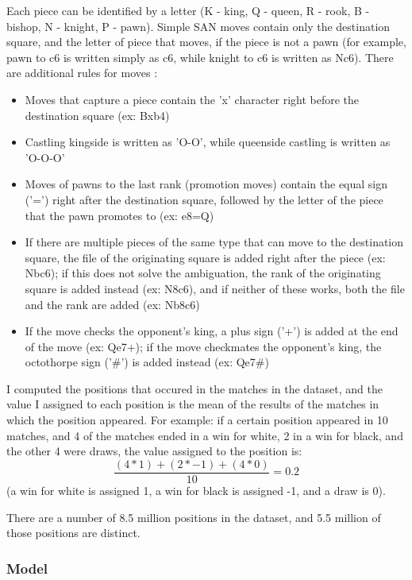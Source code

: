 Each piece can be identified by a letter (K - king, Q - queen, R - rook, B - bishop, N - knight, P - pawn). Simple SAN moves contain only the destination square, and the letter of piece that moves, if the piece is not a pawn (for example, pawn to c6 is written simply as c6, while knight to c6 is written as Nc6). There are additional rules for moves \cite{edwards1994standard}:
\begin{itemize}
    \item Moves that capture a piece contain the 'x' character right before the destination square (ex: Bxb4)
    \item Castling kingside is written as 'O-O', while queenside castling is written as 'O-O-O'
    \item Moves of pawns to the last rank (promotion moves) contain the equal sign ('=') right after the destination square, followed by the letter of the piece that the pawn promotes to (ex: e8=Q)
    \item If there are multiple pieces of the same type that can move to the destination square, the file of the originating square is added right after the piece (ex: Nbc6); if this does not solve the ambiguation, the rank of the originating square is added instead (ex: N8c6), and if neither of these works, both the file and the rank are added (ex: Nb8c6)
    \item If the move checks the opponent's king, a plus sign ('+') is added at the end of the move (ex: Qe7+); if the move checkmates the opponent's king, the octothorpe sign ('\#') is added instead (ex: Qe7\#)
\end{itemize}

I computed the positions that occured in the matches in the dataset, and the value I assigned to each position is the mean of the results of the matches in which the position appeared. For example: if a certain position appeared in 10 matches, and 4 of the matches ended in a win for white, 2 in a win for black, and the other 4 were draws, the value assigned to the position is: \[\frac{(4*1)+(2*-1)+(4*0)}{10}=0.2\] (a win for white is assigned 1, a win for black is assigned -1, and a draw is 0).


There are a number of 8.5 million positions in the dataset, and 5.5 million of those positions are distinct.

\subsubsection{Model}
\label{subsec:ch4sec3subsec2subsubsec2}

